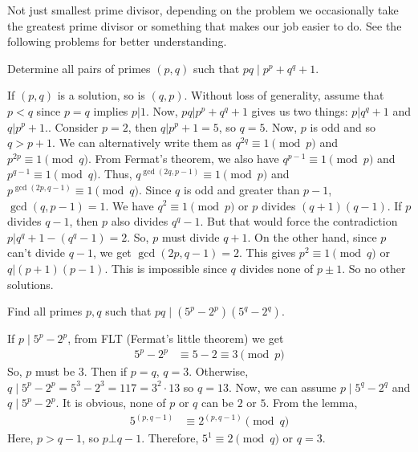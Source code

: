 \documentclass{subfile}
\begin{document}
	\begin{note}
		Not just smallest prime divisor, depending on the problem we occasionally take the greatest prime divisor or something that makes our job easier to do. See the following problems for better understanding.
	\end{note}

		\begin{problem}
			Determine all pairs of primes $(p,q)$ such that $pq\mid p^p+q^q+1$.
		\end{problem}

		\begin{solution}
			If $(p,q)$ is a solution, so is $(q,p)$. Without loss of generality, assume that $p<q$ since $p=q$ implies $p|1$. Now, $pq|p^p+q^q+1$ gives us two things: $p|q^q+1$ and $q|p^p+1$.. Consider $p=2$, then $q|p^p+1=5$, so $q=5$.
			Now, $p$ is odd and so $q>p+1$. We can alternatively write them as $q^{2q}\equiv1\pmod p$ and $p^{2p}\equiv1\pmod q$. From Fermat's theorem, we also have $q^{p-1}\equiv1\pmod p$ and $p^{q-1}\equiv1\pmod q$. Thus, $q^{\gcd(2q,p-1)}\equiv1\pmod p$ and $p^{\gcd(2p,q-1)}\equiv1\pmod q$. Since $q$ is odd and greater than $p-1$, $\gcd(q,p-1)=1$. We have $q^2\equiv1\pmod p$ or $p$ divides $(q+1)(q-1)$. If $p$ divides $q-1$, then $p$ also divides $q^q-1$. But that would force the contradiction $p|q^q+1-(q^q-1)=2$. So, $p$ must divide $q+1$. On the other hand, since $p$ can't divide $q-1$, we get $\gcd(2p,q-1)=2$. This gives $p^2\equiv1\pmod q$ or $q|(p+1)(p-1)$. This is impossible since $q$ divides none of $p\pm1$. So no other solutions.
		\end{solution}

		\begin{problem}
			Find all primes $p,q$ such that $pq\mid (5^p-2^p)(5^q-2^q)$.
		\end{problem}

		\begin{solution}
			If  $p\mid 5^p-2^p$, from FLT (Fermat's little theorem) we get
			\begin{align*}
				5^p-2^p &\equiv5-2\equiv3\pmod p
			\end{align*}
			So, $p$ must be $3$. Then if $p=q$, $q=3$. Otherwise, $q\mid 5^p-2^p=5^3-2^3=117=3^2\cdot13$ so $q=13$.  Now, we can assume $p\mid 5^q-2^q$ and $q\mid 5^p-2^p$. It is obvious, none of $p$ or $q$ can be $2$ or $5$. From the lemma,
			\begin{align*}
				5^{(p,q-1)}&\equiv2^{(p,q-1)}\pmod q
			\end{align*}
			Here, $p>q-1$, so $p\bot q-1$. Therefore, $5^1\equiv2\pmod q$ or $q=3$.
		\end{solution}
\end{document}
